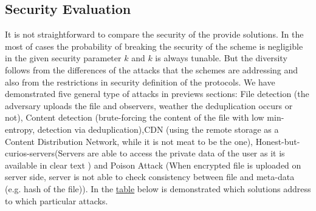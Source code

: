 \documentclass[12pt]{article}
\begin{document}
\subsection{Security Evaluation}
\label{sub:SecurityEva}
It is not straightforward to compare the security of the provide solutions. In the most of cases the probability of breaking the security of the scheme is negligible in the given security parameter $k$ and $k$ is always tunable. But the diversity follows from the differences of the attacks that the schemes are addressing and also from the restrictions  in security definition of the protocols. We have demonstrated five general type of attacks in previews sections: File detection (the adversary uploads the file and observers, weather the deduplication occurs or not), Content detection (brute-forcing  the content of the file with low min-entropy, detection via deduplication),CDN (using the remote storage as a Content Distribution
Network, while it is not meat to be the one),  Honest-but-curios-servers(Servers are able to access the private data of the user as it is available in clear text ) and Poison Attack (When encrypted file is uploaded on server side, server is not able to check consistency between file and meta-data (e.g. hash of the file)). In the \hyperref[table:Attacks]{table} below is demonstrated which solutions address to which particular attacks.\\\\
\end{document}
